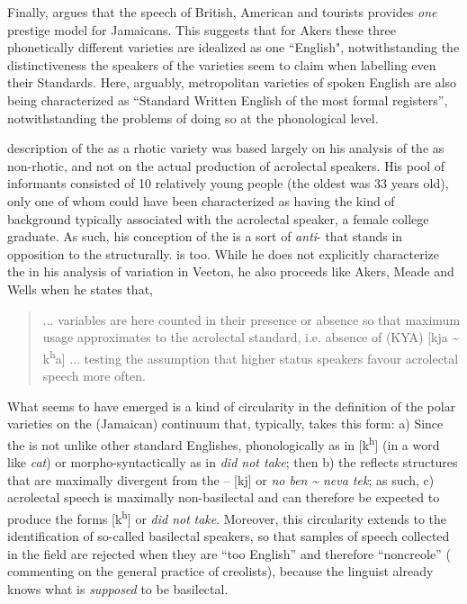 Finally, \citet[8]{Akers1981} argues that the speech of British, American and  tourists provides \textit{one} prestige model for Jamaicans.  This suggests that for Akers these three phonetically different varieties are idealized as one ``English", notwithstanding the distinctiveness the speakers of the varieties seem to claim when labelling even their Standards.  Here, arguably, metropolitan varieties of spoken English are also being characterized as “Standard Written English of the most formal registers”, notwithstanding the problems of doing so at the phonological level.  

 description of the  as a rhotic variety was based largely on his analysis of the   as non-rhotic, and not on the actual production of acrolectal speakers.  His pool of informants consisted of 10 relatively young people (the oldest was 33 years old), only one of whom could have been characterized as having the kind of background typically associated with the acrolectal speaker, a female college graduate.  As such, his conception of the  is a sort of \textit{anti}- that stands in opposition to the  structurally.   is too.  While he does not explicitly characterize the  in his analysis of variation in Veeton, he also proceeds like Akers, Meade and Wells when he states that,

\begin{quote} ... variables are here counted in their presence or absence so that maximum usage approximates to the acrolectal standard, i.e. absence of (KYA) [kja {\textasciitilde} k\textsuperscript{h}a] ... testing the assumption that higher status speakers favour acrolectal speech more often. \citep[11]{Patrick2000}\end{quote}

What seems to have emerged is a kind of circularity in the definition of the polar varieties on the (Jamaican) continuum that, typically, takes this form: a) Since the  is not unlike other standard Englishes, phonologically as in [k\textsuperscript{h}] (in a word like \textit{cat}) or morpho-syntactically as in \textit{did not take}; then b) the  reflects structures that are maximally divergent from the  – [kj] or \textit{no ben} \textit{{\textasciitilde} neva tek}; as such, c) acrolectal speech is maximally non-basilectal and can therefore be expected to produce the forms [k\textsuperscript{h}] or \textit{did not} \textit{take}.  Moreover, this circularity extends to the identification of so-called basilectal speakers, so that samples of speech collected in the field are rejected when they are “too English” and therefore “noncreole” (\citealt[74]{Escure1997} commenting on the general practice of creolists), because the linguist already knows what is \textit{supposed} to be basilectal.

